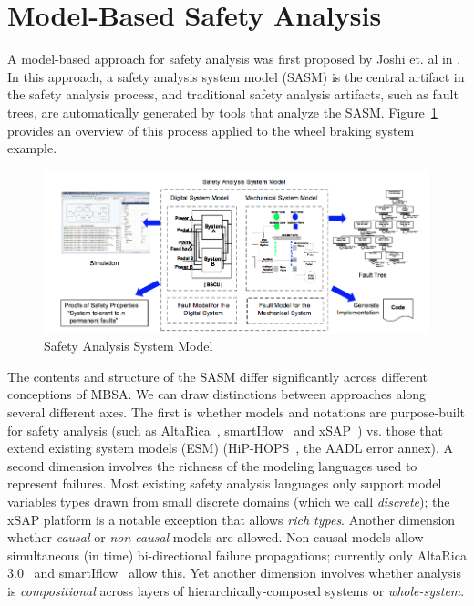 \section{Model-Based Safety Analysis}


A model-based approach for safety analysis was first proposed by Joshi et. al in \cite{Joshi05:Dasc, Joshi05:SafeComp, Joshi07:Hase}.  In this approach, a safety analysis system model (SASM) is the central artifact in the safety analysis process, and traditional safety analysis artifacts, such as fault trees, are automatically generated by tools that analyze the SASM. Figure~\ref{fig:sasm} provides an overview of this process applied to the wheel braking system example.

\begin{figure}
  \centering
 \includegraphics[width=1\textwidth]{images/SASM.png}
  \vspace{-0.1in}
  \caption{Safety Analysis System Model}
  \label{fig:sasm}
\end{figure}

The contents and structure of the SASM differ significantly across different conceptions of MBSA.  We can draw distinctions between approaches along several different axes.  The first is whether models and notations are purpose-built for safety analysis (such as AltaRica~\cite{PROSVIRNOVA2013127}, smartIflow~\cite{info8010007} and xSAP~\cite{DBLP:conf/tacas/BittnerBCCGGMMZ16}) vs. those that extend existing system models (ESM) (HiP-HOPS~\cite{CHEN201391}, the AADL error annex\cite{SAEAS}).  A second dimension involves the richness of the modeling languages used to represent failures.  Most existing safety analysis languages only support model variables types drawn from small discrete domains (which we call {\em discrete}); the xSAP platform is a notable exception that allows {\em rich types}.  Another dimension whether {\em causal } or {\em non-causal} models are allowed.  Non-causal models allow simultaneous (in time) bi-directional failure propagations; currently only AltaRica 3.0~\cite{PROSVIRNOVA2013127} and smartIflow~\cite{info8010007} allow this.  Yet another dimension involves whether analysis is {\em compositional} across layers of hierarchically-composed systems or {\em whole-system}.

